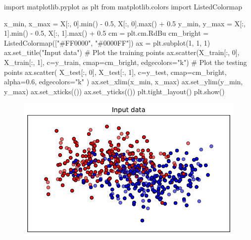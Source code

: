 \documentclass[
  letterpaper,
  DIV=11,
  numbers=noendperiod]{scrreprt}
\newenvironment{Shaded}{\begin{snugshade}}{\end{snugshade}}
\newcommand{\BuiltInTok}[1]{\textcolor[rgb]{0.00,0.23,0.31}{#1}}
\newcommand{\CommentTok}[1]{\textcolor[rgb]{0.37,0.37,0.37}{#1}}
\newcommand{\DecValTok}[1]{\textcolor[rgb]{0.68,0.00,0.00}{#1}}
\newcommand{\FloatTok}[1]{\textcolor[rgb]{0.68,0.00,0.00}{#1}}
\newcommand{\ImportTok}[1]{\textcolor[rgb]{0.00,0.46,0.62}{#1}}
\newcommand{\NormalTok}[1]{\textcolor[rgb]{0.00,0.23,0.31}{#1}}
\newcommand{\OperatorTok}[1]{\textcolor[rgb]{0.37,0.37,0.37}{#1}}
\newcommand{\StringTok}[1]{\textcolor[rgb]{0.13,0.47,0.30}{#1}}
\begin{document}
\begin{Shaded}
\begin{Highlighting}[]
\ImportTok{import}\NormalTok{ matplotlib.pyplot }\ImportTok{as}\NormalTok{ plt}
\ImportTok{from}\NormalTok{ matplotlib.colors }\ImportTok{import}\NormalTok{ ListedColormap}

\NormalTok{x\_min, x\_max }\OperatorTok{=}\NormalTok{ X[:, }\DecValTok{0}\NormalTok{].}\BuiltInTok{min}\NormalTok{() }\OperatorTok{{-}} \FloatTok{0.5}\NormalTok{, X[:, }\DecValTok{0}\NormalTok{].}\BuiltInTok{max}\NormalTok{() }\OperatorTok{+} \FloatTok{0.5}
\NormalTok{y\_min, y\_max }\OperatorTok{=}\NormalTok{ X[:, }\DecValTok{1}\NormalTok{].}\BuiltInTok{min}\NormalTok{() }\OperatorTok{{-}} \FloatTok{0.5}\NormalTok{, X[:, }\DecValTok{1}\NormalTok{].}\BuiltInTok{max}\NormalTok{() }\OperatorTok{+} \FloatTok{0.5}
\NormalTok{cm }\OperatorTok{=}\NormalTok{ plt.cm.RdBu}
\NormalTok{cm\_bright }\OperatorTok{=}\NormalTok{ ListedColormap([}\StringTok{"\#FF0000"}\NormalTok{, }\StringTok{"\#0000FF"}\NormalTok{])}
\NormalTok{ax }\OperatorTok{=}\NormalTok{ plt.subplot(}\DecValTok{1}\NormalTok{, }\DecValTok{1}\NormalTok{, }\DecValTok{1}\NormalTok{)}
\NormalTok{ax.set\_title(}\StringTok{"Input data"}\NormalTok{)}
\CommentTok{\# Plot the training points}
\NormalTok{ax.scatter(X\_train[:, }\DecValTok{0}\NormalTok{], X\_train[:, }\DecValTok{1}\NormalTok{], c}\OperatorTok{=}\NormalTok{y\_train, cmap}\OperatorTok{=}\NormalTok{cm\_bright, edgecolors}\OperatorTok{=}\StringTok{"k"}\NormalTok{)}
\CommentTok{\# Plot the testing points}
\NormalTok{ax.scatter(}
\NormalTok{    X\_test[:, }\DecValTok{0}\NormalTok{], X\_test[:, }\DecValTok{1}\NormalTok{], c}\OperatorTok{=}\NormalTok{y\_test, cmap}\OperatorTok{=}\NormalTok{cm\_bright, alpha}\OperatorTok{=}\FloatTok{0.6}\NormalTok{, edgecolors}\OperatorTok{=}\StringTok{"k"}
\NormalTok{)}
\NormalTok{ax.set\_xlim(x\_min, x\_max)}
\NormalTok{ax.set\_ylim(y\_min, y\_max)}
\NormalTok{ax.set\_xticks(())}
\NormalTok{ax.set\_yticks(())}
\NormalTok{plt.tight\_layout()}
\NormalTok{plt.show()}
\end{Highlighting}
\end{Shaded}

\begin{figure}[H]

{\centering \includegraphics{017_spot_hpt_sklearn_classification_files/figure-pdf/cell-5-output-1.pdf}

}

\end{figure}
\end{document}
